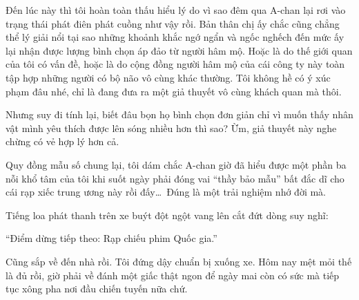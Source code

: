 \documentclass[../main.tex]{subfiles}
\begin{document}
Đến lúc này thì tôi hoàn toàn thấu hiểu lý do vì sao đêm qua A-chan lại rơi vào trạng thái phát điên phát cuồng như vậy rồi. Bản thân chị ấy chắc cũng chẳng thể lý giải nổi tại sao những khoảnh khắc ngớ ngẩn và ngốc nghếch đến mức ấy lại nhận được lượng bình chọn áp đảo từ người hâm mộ. Hoặc là do thế giới quan của tôi có vấn đề, hoặc là do cộng đồng người hâm mộ của cái công ty này toàn tập hợp những người có bộ não vô cùng khác thường. Tôi không hề có ý xúc phạm đâu nhé, chỉ là đang đưa ra một giả thuyết vô cùng khách quan mà thôi.

Nhưng suy đi tính lại, biết đâu bọn họ bình chọn đơn giản chỉ vì muốn thấy nhân vật mình yêu thích được lên sóng nhiều hơn thì sao? Ừm, giả thuyết này nghe chừng có vẻ hợp lý hơn cả.

Quy đồng mẫu số chung lại, tôi dám chắc A-chan giờ đã hiểu được một phần ba nỗi khổ tâm của tôi khi suốt ngày phải đóng vai ``thầy bảo mẫu'' bất đắc dĩ cho cái rạp xiếc trung ương này rồi đấy\dots\ Đúng là một trải nghiệm nhớ đời mà.

Tiếng loa phát thanh trên xe buýt đột ngột vang lên cắt đứt dòng suy nghĩ:
\begin{center}
  ``Điểm dừng tiếp theo: Rạp chiếu phim Quốc gia.''
\end{center}

Cũng sắp về đến nhà rồi. Tôi đứng dậy chuẩn bị xuống xe. Hôm nay mệt mỏi thế là đủ rồi, giờ phải về đánh một giấc thật ngon để ngày mai còn có sức mà tiếp tục xông pha nơi đầu chiến tuyến nữa chứ.
\end{document}
